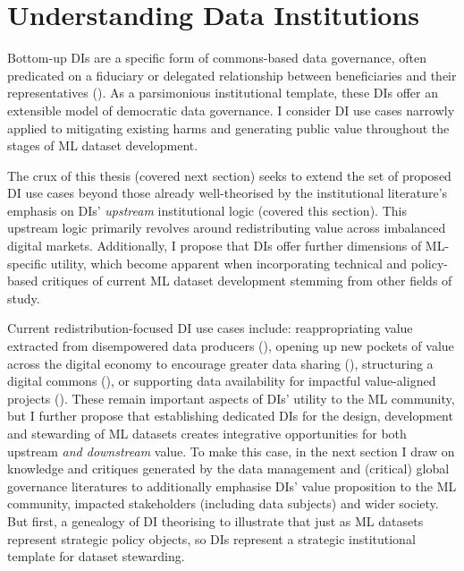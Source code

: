 \chapter{Understanding Data Institutions}

Bottom-up DIs are a specific form of commons-based data governance, often predicated on a fiduciary or delegated relationship between beneficiaries and their representatives (\cite{delacroix2020DemocratisingDigitalRevolution}). As a parsimonious institutional template, these DIs offer an extensible model of democratic data governance. I consider DI use cases narrowly applied to mitigating existing harms and generating public value throughout the stages of ML dataset development.


The crux of this thesis (covered next section) seeks to extend the set of proposed DI use cases beyond those already well-theorised by the institutional literature's emphasis on DIs' \textit{upstream} institutional logic (covered this section). This upstream logic primarily revolves around redistributing value across imbalanced digital markets. Additionally, I propose that DIs offer further dimensions of ML-specific utility, which become apparent when incorporating technical and policy-based critiques of current ML dataset development stemming from other fields of study.

Current redistribution-focused DI use cases include: reappropriating value extracted from disempowered data producers (\cite{birkinbine2018CommonsPraxisCritical, loi2023RawlsianPropertyowningDemocracy, spiekermann2021BigDataJustice}), opening up new pockets of value across the digital economy to encourage greater data sharing (\cite{2023UnderstandingSocialEconomic}), structuring a digital commons (\cite{delacroix2019BottomupDataTrusts, singh2019DataDigitalIntelligence}), or supporting data availability for impactful value-aligned projects (\cite{baarbe2019ProposedAgriculturalData}). These remain important aspects of DIs' utility to the ML community, but I further propose that establishing dedicated DIs for the design, development and stewarding of ML datasets creates integrative opportunities for both upstream \textit{and downstream} value. To make this case, in the next section I draw on knowledge and critiques generated by the data management and (critical) global governance literatures to additionally emphasise DIs' value proposition to the ML community, impacted stakeholders (including data subjects) and wider society. But first, a genealogy of DI theorising to illustrate that just as ML datasets represent strategic policy objects, so DIs represent a strategic institutional template for dataset stewarding.

